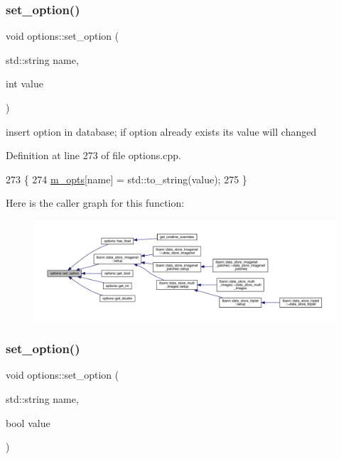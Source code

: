 \subsubsection{\texorpdfstring{set\+\_\+option()}{set\_option()}\hspace{0.1cm}{\footnotesize\ttfamily [1/5]}}
{\footnotesize\ttfamily void options\+::set\+\_\+option (\begin{DoxyParamCaption}\item[{std\+::string}]{name,  }\item[{int}]{value }\end{DoxyParamCaption})}

insert option in database; if option already exists it\textquotesingle{}s value will changed 

Definition at line 273 of file options.\+cpp.


\begin{DoxyCode}
273                                                   \{
274   \hyperlink{classoptions_ac73507ca925d98ee5ff6f04937dff5c3}{m\_opts}[name] = std::to\_string(value);
275 \}
\end{DoxyCode}
Here is the caller graph for this function\+:\nopagebreak
\begin{figure}[H]
\begin{center}
\leavevmode
\includegraphics[width=350pt]{classoptions_a3c23831e4218f9a88cddc81337518046_icgraph}
\end{center}
\end{figure}
\mbox{\label{classoptions_ad2b98890aee35b50534117b34617a43f}} 
\subsubsection{\texorpdfstring{set\+\_\+option()}{set\_option()}\hspace{0.1cm}{\footnotesize\ttfamily [2/5]}}
{\footnotesize\ttfamily void options\+::set\+\_\+option (\begin{DoxyParamCaption}\item[{std\+::string}]{name,  }\item[{bool}]{value }\end{DoxyParamCaption})}



